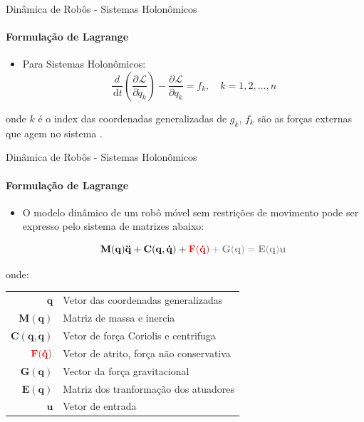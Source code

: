 \documentclass[aspectratio=169]{beamer}
\newcommand{\df}[1]{\,\mathrm{d}#1}
\newcommand{\parcial}[3]{\dfrac{\partial^{#1}#2}{\partial #3^{#1}}}
\begin{document}
\begin{frame}{Dinâmica de Robôs - Sistemas Holonômicos}
    \framesubtitle{Formulação de Lagrange}

    \begin{itemize}
        \item Para Sistemas Holonômicos:
              \begin{equation}
                  \frac{d}{\df{t}}\left( \parcial{}{\mathcal{L}}{\dot{q}_k}\right)
                  -\parcial{}{\mathcal{L}}{q_k}
                  = f_k, \quad k = 1,2,...,n
              \end{equation}

    \end{itemize}
    \begin{block}{}
        onde $k$ é o index das coordenadas generalizadas de $g_k$, $f_k$ são as forças externas que agem no sistema .
    \end{block} 
\end{frame}


\begin{frame}{Dinâmica de Robôs - Sistemas Holonômicos}
    \framesubtitle{Formulação de Lagrange}
    \begin{itemize}
        \item O modelo dinâmico de um robô móvel sem restrições de movimento pode ser expresso pelo sistema de matrizes abaixo:

              \begin{equation}
                  \mathbf{M(q)\ddot{q}+ C(q, \dot{q})+ \color{red}{F(\dot{q})}\color{gray}+G(q) = E(q)u}
              \end{equation}
    \end{itemize}

    \begin{block}{}
        \scriptsize{
            onde:
            \begin{tabular}{ r | l }
                $\mathbf{q}$               & Vetor das coordenadas generalizadas   \\
                $\mathbf{M(q)}$            & Matriz de massa e inercia             \\
                $\mathbf{C(q, \dot{q})}$   & Vetor de força Coriolis e centrifuga  \\
                $\color{red}{\mathbf{F(\dot{q})}}$      & Vetor de atrito, força não conservativa\footnotemark\\
                $\mathbf{G(q)}$            & Vector da força gravitacional         \\
                $\mathbf{E(q)}$            & Matriz dos tranformação dos atuadores \\
                $\mathbf{u}$               & Vetor de entrada                      \\
            \end{tabular}}
    \end{block}
\end{frame}
\end{document}
